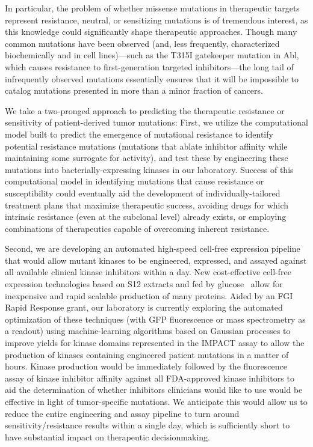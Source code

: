 \documentclass[10pt]{article}
\begin{document}
In particular, the problem of whether missense mutations in therapeutic targets represent resistance, neutral, or sensitizing mutations is of tremendous interest, as this knowledge could significantly shape therapeutic approaches.
Though many common mutations have been observed (and, less frequently, characterized biochemically and in cell lines)---such as the T315I gatekeeper mutation in Abl, which causes resistance to first-generation targeted inhibitors---the long tail of infrequently observed mutations essentially ensures that it will be impossible to catalog mutations presented in more than a minor fraction of cancers.

We take a two-pronged approach to predicting the therapeutic resistance or sensitivity of patient-derived tumor mutations:
First, we utilize the computational model built to predict the emergence of mutational resistance to identify potential resistance mutations (mutations that ablate inhibitor affinity while maintaining some surrogate for activity), and test these by engineering these mutations into bacterially-expressing kinases in our laboratory.
Success of this computational model in identifying mutations that cause resistance or susceptibility could eventually aid the development of individually-tailored treatment plans that maximize therapeutic success, avoiding drugs for which intrinsic resistance (even at the subclonal level) already exists, or employing combinations of therapeutics capable of overcoming inherent resistance.

Second, we are developing an automated high-speed cell-free expression pipeline that would allow mutant kinases to be engineered, expressed, and assayed against all available clinical kinase inhibitors within a day.
New cost-effective cell-free expression technologies based on S12 extracts and fed by glucose~\cite{kim_simple_2006,calhoun_economical_2008} allow for inexpensive and rapid scalable production of many proteins.
Aided by an FGI Rapid Response grant, our laboratory is currently exploring the automated optimization of these techniques (with GFP fluorescence or mass spectrometry as a readout) using machine-learning algorithms based on Gaussian processes to improve yields for kinase domains represented in the IMPACT assay to allow the production of kinases containing engineered patient mutations in a matter of hours.
Kinase production would be immediately followed by the fluorescence assay of kinase inhibitor affinity against all FDA-approved kinase inhibitors to aid the determination of whether inhibitors clinicians would like to use would be effective in light of tumor-specific mutations.
We anticipate this would allow us to reduce the entire engineering and assay pipeline to turn around sensitivity/resistance results within a single day, which is sufficiently short to have substantial impact on therapeutic decisionmaking.
\end{document}
